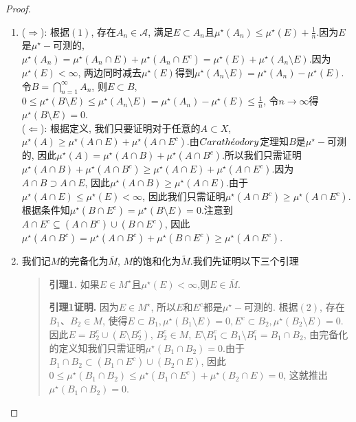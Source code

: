 \documentclass[lang=cn,12pt,a4paper]{elegantpaper.cls}
\begin{document}
\begin{enumerate}
\begin{proof}
\begin{enumerate}[(1)]
			\item ($\Longrightarrow$): 根据$(1)$, 存在$A_n\in{\mathscr{A}}$, 满足$E\subset{A_n}$且$\mu^{\star}(A_n)\leq\mu^{\star}(E)+\frac{1}{n}$.因为$E$是$\mu^{\star}-$可测的, $\mu^{\star}(A_n)=\mu^{\star}(A_n\cap{E})+\mu^{\star}(A_n\cap{E^{c}})=\mu^{\star}(E)+\mu^{\star}(A_n\setminus{E})$.因为$\mu^{\star}(E)<{\infty}$, 两边同时减去$\mu^{\star}(E)$得到$\mu^{\star}(A_n\setminus{E})=\mu^{\star}(A_n)-\mu^{\star}(E)$.令$B=\bigcap\limits_{n=1}^{\infty}A_n$, 则$E\subset{B}$, $0\leq\mu^{\star}(B\setminus{E})\leq\mu^{\star}(A_n\setminus{E})=\mu^{\star}(A_n)-\mu^{\star}(E)\leq\frac{1}{n}$, 令$n\rightarrow\infty$得$\mu^{\star}(B\setminus{E})=0$.\\($\Longleftarrow$): 根据定义, 我们只要证明对于任意的$A\subset{X}$, $\mu^{\star}(A)\geqslant\mu^{\star}(A\cap{E})+\mu^{\star}(A\cap{E^{c}})$.由$Carath\Acute{e}odory$定理知$B$是$\mu^{\star}-$可测的, 因此$\mu^{\star}(A)=\mu^{\star}(A\cap{B})+\mu^{\star}(A\cap{B^{c}})$.所以我们只需证明$\mu^{\star}(A\cap{B})+\mu^{\star}(A\cap{B^{c}})\geqslant\mu^{\star}(A\cap{E})+\mu^{\star}(A\cap{E^{c}})$.因为$A\cap{B}\supset{A\cap{E}}$, 因此$\mu^{\star}(A\cap{B})\geqslant\mu^{\star}(A\cap{E})$.由于$\mu^{\star}(A\cap{E})\leq\mu^{\star}(E)<\infty$, 因此我们只需证明$\mu^{\star}(A\cap{B^{c}})\geqslant\mu^{\star}(A\cap{E^{c}})$.根据条件知$\mu^{\star}(B\cap{E^{c}})=\mu^{\star}(B\setminus{E})=0$.注意到$A\cap{E^{c}}\subseteq{(A\cap{B^{c}})\cup(B\cap{E^{c}})}$, 因此$\mu^{\star}(A\cap{B^{c}})=\mu^{\star}(A\cap{B^{c}})+\mu^{\star}(B\cap{E^{c}})\geqslant\mu^{\star}(A\cap{E^{c}})$.
			\item 
			我们记$M$的完备化为$\overline{M}$, $M$的饱和化为$\widetilde{M}$.我们先证明以下三个引理
			
			\begin{quote}
				\textbf{引理1.} 如果$E\in{M^{\star}}$且$\mu^{\star}(E)<\infty$,则$E\in{\overline{M}}$.
				
				\textbf{引理1证明.} 因为$E\in{M^{\star}}$, 所以$E$和$E^{c}$都是$\mu^{\star}-$可测的. 根据$(2)$, 存在$B_1$、$B_2\in{M}$, 使得$E\subset{B_1},\mu^{\star}(B_1\setminus{E})=0,E^{c}\subset{B_2},\mu^{\star}(B_2\setminus{E})=0$.因此$E=B_2^{c}\cup({E\setminus{B_2^{c}}})$, $B_2^{c}\in{M}$, $E\setminus{B_1^{c}}\subset{B_1\setminus{B_1^{c}}}=B_1\cap{B_2}$, 由完备化的定义知我们只需证明$\mu^{\star}(B_1\cap{B_2})=0$.由于$B_1\cap{B_2}\subset{(B_1\cap{E^{c}})\cup({B_2\cap{E}})}$, 因此$0\leq\mu^{\star}(B_1\cap{B_2})\leq\mu^{\star}(B_1\cap{E^{c}})+\mu^{\star}({B_2\cap{E}})=0$, 这就推出$\mu^{\star}(B_1\cap{B_2})=0$.
				

\end{quote}
\end{enumerate}
\end{proof}
\end{enumerate}
\end{document}
